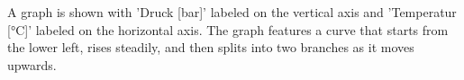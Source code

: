 A graph is shown with 'Druck [bar]' labeled on the vertical axis and 'Temperatur [°C]' labeled on the horizontal axis. The graph features a curve that starts from the lower left, rises steadily, and then splits into two branches as it moves upwards.